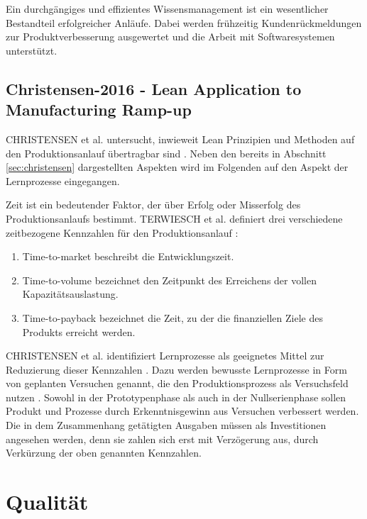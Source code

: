 Ein durchgängiges und effizientes Wissensmanagement ist ein wesentlicher Bestandteil erfolgreicher Anläufe. Dabei werden frühzeitig Kundenrückmeldungen zur Produktverbesserung ausgewertet und die Arbeit mit Softwaresystemen unterstützt. 

\subsection*{Christensen-2016 - Lean Application to Manufacturing Ramp-up}
CHRISTENSEN et al. untersucht, inwieweit Lean Prinzipien und Methoden auf den Produktionsanlauf übertragbar sind \autocite{Christensen2016}. Neben den bereits in Abschnitt \ref{sec:christensen} dargestellten Aspekten wird im Folgenden auf den Aspekt der Lernprozesse eingegangen. 


Zeit ist ein bedeutender Faktor, der über Erfolg oder Misserfolg des Produktionsanlaufs bestimmt. TERWIESCH et al. definiert drei verschiedene zeitbezogene Kennzahlen für den Produktionsanlauf \autocite{Terwiesch2001}: 
\begin{enumerate}
 \item Time-to-market beschreibt die Entwicklungszeit.
 \item Time-to-volume bezeichnet den Zeitpunkt des Erreichens der vollen Kapazitätsauslastung.
 \item Time-to-payback bezeichnet die Zeit, zu der die finanziellen Ziele des Produkts erreicht werden. 
\end{enumerate}

CHRISTENSEN et al. identifiziert Lernprozesse als geeignetes Mittel zur Reduzierung dieser Kennzahlen \autocite{Christensen2016}.
Dazu werden bewusste Lernprozesse in Form von geplanten Versuchen genannt, die den Produktionsprozess als Versuchsfeld nutzen \autocite{Terwiesch2001}.  Sowohl in der Prototypenphase als auch in der Nullserienphase sollen Produkt und Prozesse durch Erkenntnisgewinn aus Versuchen verbessert werden. Die in dem Zusammenhang getätigten Ausgaben müssen als Investitionen angesehen werden, denn sie zahlen sich erst mit Verzögerung aus, durch Verkürzung der oben genannten Kennzahlen. 


\section{Qualität}


